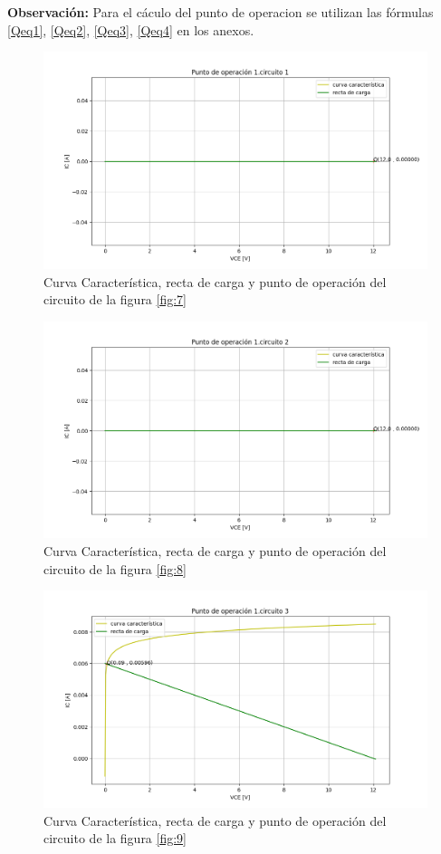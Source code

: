 \documentclass[10pt, a4paper]{article}
\begin{document}
    {\bf Observación:} Para el cáculo del punto de operacion se utilizan las fórmulas \ref{Qeq1}, \ref{Qeq2}, \ref{Qeq3}, \ref{Qeq4} en los anexos.
    
    \newpage

    \begin{figure}[h!]
        \centering
        \includegraphics[height=5cm\textwidth]{1cir1.png}
        \caption{Curva Característica, recta de carga y punto de operación del circuito de la figura \ref{fig:7}}
        \label{fig:1cir1}
    \end{figure}

    \begin{figure}[h!]
        \centering
        \includegraphics[height=5cm\textwidth]{1cir2.png}
        \caption{Curva Característica, recta de carga y punto de operación del circuito de la figura \ref{fig:8}}
        \label{fig:1cir2}
    \end{figure}

    \begin{figure}[h!]
        \centering
        \includegraphics[height=5cm\textwidth]{1cir3.png}
        \caption{Curva Característica, recta de carga y punto de operación del circuito de la figura \ref{fig:9}}
        \label{fig:1cir3}
    \end{figure}
\end{document}
